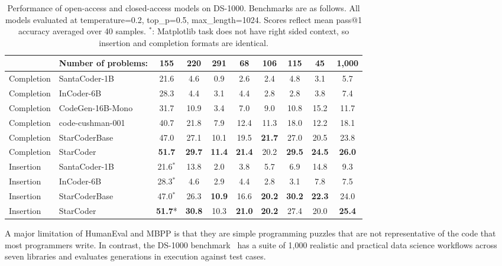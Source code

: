 \documentclass[10pt]{article} %
\begin{document}
\begin{table}[t]
{\begin{tabular}{llcccccccc}
\midrule
           & \textrm{Number of problems:} 
& 155 & 220 & 291 & 68 & 106 & 115 & 45 & 1,000\\
\midrule
Completion & SantaCoder-1B & 21.6 & 4.6 & 0.9 & 2.6 & 2.4 & 4.8 & 3.1 & 5.7\\ 
Completion & InCoder-6B & 28.3 &  4.4 & 3.1 & 4.4 &  2.8 & 2.8 & 3.8 & 7.4 \\ 
Completion & CodeGen-16B-Mono & 31.7 & 10.9 & 3.4 & 7.0 & 9.0 & 10.8 & 15.2 & 11.7 \\ 
Completion & code-cushman-001 & 40.7 & 21.8 & 7.9 & 12.4 & 11.3 & 18.0 & 12.2 & 18.1 \\ 
Completion & StarCoderBase & 47.0 & 27.1 & 10.1 & 19.5 & \textbf{21.7} & 27.0 & 20.5 & 23.8 \\ 
Completion & StarCoder & \textbf{51.7} & \textbf{29.7} & \textbf{11.4} & \textbf{21.4} & 20.2 & \textbf{29.5} & \textbf{24.5} & \textbf{26.0} \\
\midrule
Insertion & SantaCoder-1B & 21.6$^*$ & 13.8 & 2.0 & 3.8 & 5.7 & 6.9 & 14.8 &  9.3 \\ 
Insertion & InCoder-6B & 28.3$^*$ & 4.6 & 2.9 & 4.4 & 2.8 & 3.1 & 7.8 & 7.5 \\ 
Insertion & StarCoderBase & 47.0$^*$ & 26.3 & \textbf{10.9} & 16.6 & \textbf{20.2} & \textbf{30.2} & \textbf{22.3} & 24.0 \\ 
Insertion & StarCoder & \textbf{51.7}* & \textbf{30.8} & 10.3 & \textbf{21.0} & \textbf{20.2} & 27.4 & 20.0 & \textbf{25.4} \\
\bottomrule
\end{tabular}
}
\caption{Performance of open-access and closed-access models on DS-1000. Benchmarks are as follows. All models evaluated at temperature=0.2, top\_p=0.5, max\_length=1024. Scores reflect mean pass@1 accuracy averaged over 40 samples. $^*$: Matplotlib task does not have right sided context, so insertion and completion formats are identical.} 
\label{tab:ds1000}
\end{table}

A major limitation of HumanEval and MBPP is that they are simple programming puzzles that are not representative of the code that most programmers write. In contrast, the DS-1000 benchmark~\citep{Lai2022DS1000} has a suite of 1,000 realistic and practical data science workflows across seven libraries and evaluates generations in execution against test cases.
\end{document}
